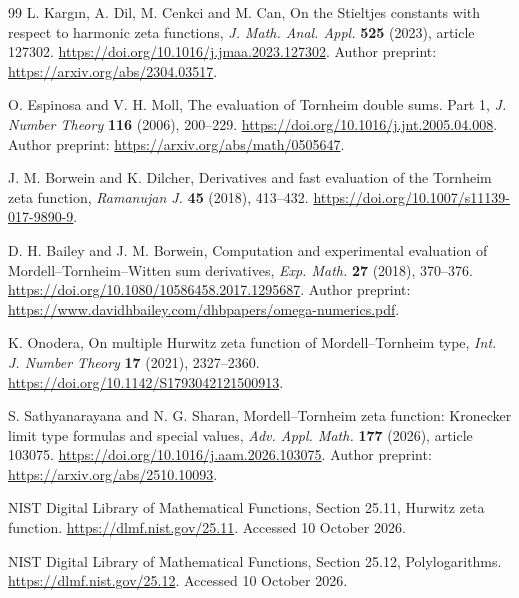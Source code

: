 \documentclass[11pt,letterpaper]{article}
\numberwithin{equation}{section}
\theoremstyle{definition}
\theoremstyle{remark}
\begin{document}
\begin{thebibliography}{99}
L. Karg\i n, A. Dil, M. Cenkci and M. Can,
On the Stieltjes constants with respect to harmonic zeta functions,
\emph{J. Math. Anal. Appl.} \textbf{525} (2023), article 127302.
\url{https://doi.org/10.1016/j.jmaa.2023.127302}.
Author preprint: \url{https://arxiv.org/abs/2304.03517}.

O. Espinosa and V. H. Moll,
The evaluation of Tornheim double sums. Part 1,
\emph{J. Number Theory} \textbf{116} (2006), 200--229.
\url{https://doi.org/10.1016/j.jnt.2005.04.008}.
Author preprint: \url{https://arxiv.org/abs/math/0505647}.

J. M. Borwein and K. Dilcher,
Derivatives and fast evaluation of the Tornheim zeta function,
\emph{Ramanujan J.} \textbf{45} (2018), 413--432.
\url{https://doi.org/10.1007/s11139-017-9890-9}.

D. H. Bailey and J. M. Borwein,
Computation and experimental evaluation of Mordell--Tornheim--Witten
sum derivatives,
\emph{Exp. Math.} \textbf{27} (2018), 370--376.
\url{https://doi.org/10.1080/10586458.2017.1295687}.
Author preprint:
\url{https://www.davidhbailey.com/dhbpapers/omega-numerics.pdf}.

K. Onodera, On multiple Hurwitz zeta function of Mordell--Tornheim type,
\emph{Int. J. Number Theory} \textbf{17} (2021), 2327--2360.
\url{https://doi.org/10.1142/S1793042121500913}.

S. Sathyanarayana and N. G. Sharan,
Mordell--Tornheim zeta function: Kronecker limit type formulas and
special values,
\emph{Adv. Appl. Math.} \textbf{177} (2026), article 103075.
\url{https://doi.org/10.1016/j.aam.2026.103075}.
Author preprint: \url{https://arxiv.org/abs/2510.10093}.

NIST Digital Library of Mathematical Functions,
Section 25.11, Hurwitz zeta function.
\url{https://dlmf.nist.gov/25.11}. Accessed 10 October 2026.

NIST Digital Library of Mathematical Functions,
Section 25.12, Polylogarithms.
\url{https://dlmf.nist.gov/25.12}. Accessed 10 October 2026.

\end{thebibliography}

\end{document}
